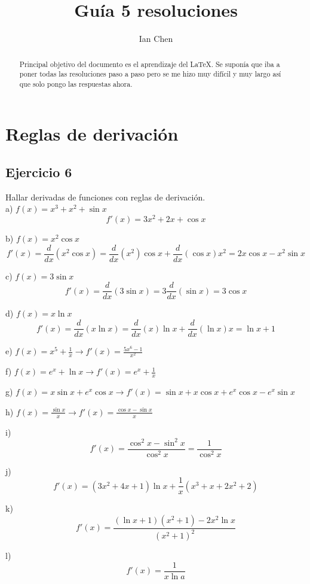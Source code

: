 \documentclass[18pt, a4paper]{article}
\title{Guía 5 resoluciones}
\author{Ian Chen}
\begin{document}
\maketitle

\begin{abstract}
Principal objetivo del documento es el aprendizaje del \LaTeX. Se suponía que iba a poner todas las resoluciones paso a paso pero se me hizo muy difícil y muy largo así que solo pongo las respuestas ahora. 
\end{abstract}



\section{Reglas de derivación}
\subsection{Ejercicio 6}
Hallar derivadas de funciones con reglas de derivación.\\[6pt]

a) $f(x)=x^3+x^2+\sin x$
$$f'(x)=3x^2+2x+\cos x$$

b) $f(x)=x^2 \cos x$
$$f'(x)=\frac{d}{dx}\left(x^2 \cos x \right)=\frac{d}{dx}\left(x^2 \right)\cos x + \frac{d}{dx}\left(\cos x\right)x^2=2x \cos x - x^2 \sin x$$

c) $f(x)=3\sin x$
$$f'(x)=\frac{d}{dx}\left(3\sin x\right)=3\frac{d}{dx}\left(\sin x\right)= 3\cos x$$

d) $f(x)=x \ln x$
$$f'(x)= \frac{d}{dx}\left(x \ln x\right) = \frac{d}{dx}\left(x\right)\ln x + \frac{d}{dx}\left(\ln x\right)x= \ln x + 1$$

e) $f(x)=x^5+\frac{1}{x}\rightarrow f'(x)=\frac{5x^6-1}{x^2}$

f) $f(x)=e^x+\ln x \rightarrow  f'(x)=e^x+\frac{1}{x}$

g) $f(x)=x\sin x + e^x\cos x \rightarrow f'(x)=\sin x + x\cos x + e^x\cos x - e^x\sin x$

h) $f(x)=\frac{\sin x}{x} → f'(x)=\frac{\cos x - \sin x}{x}$

i) $$f'(x)=\frac{\cos^2x-\sin^2x}{\cos^2x}=\frac{1}{\cos^2x}$$

j) $$f'(x)=\left(3x^2+4x+1\right)\ln x + \frac{1}{x}\left(x^3+x+2x^2+2\right)$$

k) $$f'(x)=\frac{\left(\ln x + 1\right)\left(x^2 + 1\right) - 2x^2\ln x}{\left(x^2+1\right)^2}$$

l) $$f'(x)= \frac{1}{x\ln a}$$
\end{document}
